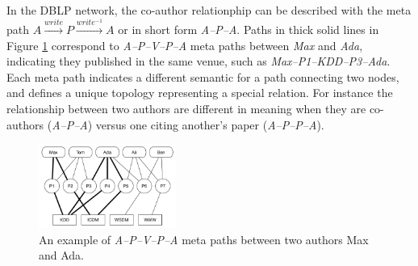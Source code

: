 In the DBLP network, the co-author relationphip can be described with the meta path $A\xrightarrow{write}P\xrightarrow{write^{-1}}A$ or in short form \textit{A--P--A}. Paths in thick solid lines in Figure \ref{sampleNetwork} correspond to \textit{A--P--V--P--A} meta paths between \textit{Max} and \textit{Ada}, indicating they published in the same venue, such as \textit{Max--P1--KDD--P3--Ada}. %
Each meta path indicates a different semantic for a path connecting two nodes, and defines a unique topology representing a special relation. For instance the relationship between two authors are different in meaning when they are co-authors (\textit{A--P--A}) versus one citing another's paper (\textit{A--P--P--A}).

\begin{figure}[t]
  \centering
      \includegraphics[width=0.4\textwidth]{figs/exampleSocialNetwork.pdf}
  \caption{An example of \textit{A--P--V--P--A} meta paths between two authors Max and Ada.}\label{sampleNetwork}
\end{figure}





